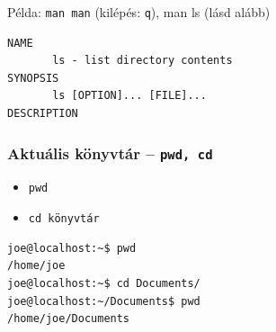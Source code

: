 Példa: \texttt{man man} (kilépés: \texttt{q}), man ls (lásd alább)

\begin{lstlisting}
NAME
       ls - list directory contents
SYNOPSIS
       ls [OPTION]... [FILE]...
DESCRIPTION
\end{lstlisting}


\subsubsection*{Aktuális könyvtár -- \texttt{pwd, cd}}

\begin{itemize}
\item[]
	\hfill\texttt{pwd}
	
\item[]
	\hfill\texttt{cd könyvtár}
\end{itemize}

\begin{lstlisting}
joe@localhost:~$ pwd
/home/joe
joe@localhost:~$ cd Documents/
joe@localhost:~/Documents$ pwd
/home/joe/Documents
\end{lstlisting}




